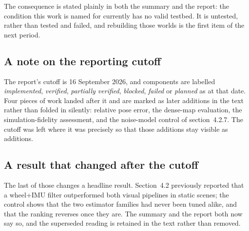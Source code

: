 \documentclass[11pt,a4paper]{article}
\begin{document}
The consequence is stated plainly in both the summary and the report: the
condition this work is named for currently has no valid testbed. It is untested,
rather than tested and failed, and rebuilding those worlds is the first item of
the next period.

\subsection*{A note on the reporting cutoff}

The report's cutoff is 16 September 2026, and components are labelled
\emph{implemented}, \emph{verified}, \emph{partially verified}, \emph{blocked},
\emph{failed} or \emph{planned} as at that date. Four pieces of work landed
after it and are marked as later additions in the text rather than folded in
silently: relative pose error, the dense-map evaluation, the simulation-fidelity
assessment, and the noise-model control of section~4.2.7. The cutoff was left
where it was precisely so that those additions stay visible as additions.

\subsection*{A result that changed after the cutoff}

The last of those changes a headline result. Section~4.2 previously reported
that a wheel+IMU filter outperformed both visual pipelines in static scenes; the
control shows that the two estimator families had never been tuned alike, and
that the ranking reverses once they are. The summary and the report both now say
so, and the superseded reading is retained in the text rather than removed.

\clearpage




\end{document}
